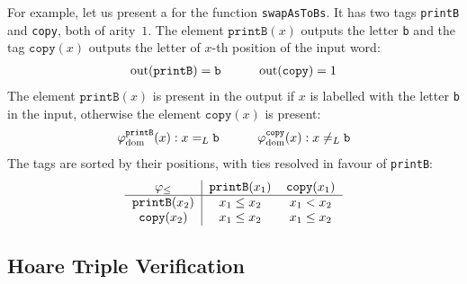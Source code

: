 For example, let us present a  for the function \texttt{swapAsToBs}. 
It has two tags \texttt{printB} and \texttt{copy}, both of arity~$1$. 
The element $\mathtt{printB}(x)$ outputs the letter \texttt{b} and the tag $\mathtt{copy}(x)$
outputs the letter of $x$-th position of the input word:
\[
\begin{tabular}{ccc}
    $\text{out}(\mathtt{printB}) = \mathtt{b}$ & \ \ \ & $\text{out}(\mathtt{copy}) = 1$ \\
\end{tabular}
\]
The element $\mathtt{printB}(x)$ is present in the output if $x$ is labelled with the letter \texttt{b}
in the input, otherwise the element $\mathtt{copy}(x)$ is present:
\[
\begin{tabular}{ccc}
    $\varphi_{\text{dom}}^{\mathtt{printB}}(x) : x =_L \mathtt{b}$ & \ \ \  &$\varphi_{\text{dom}}^{\mathtt{copy}}(x) : x \neq_L \mathtt{b}$ \\
\end{tabular}
\]
The tags are sorted by their positions, with ties resolved in favour of \texttt{printB}:
\[ 
\begin{tabular}{c|cc}
    $\varphi_{\leq}$ & $\mathtt{printB}(x_1)$ & $\mathtt{copy}(x_1)$ \\
    \hline
    $\mathtt{printB}(x_2)$ & $x_1 \leq x_2$ & $x_1 < x_2$ \\
    $\mathtt{copy}(x_2)$ & $x_1 \leq x_2$ & $x_1 \leq x_2$ \\
\end{tabular}
\]

\subsection{Hoare Triple Verification}

